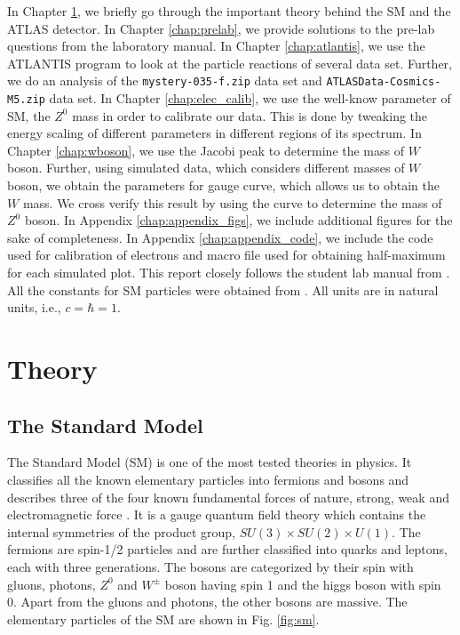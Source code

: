 \documentclass[a4paper]{report}
\numberwithin{equation}{section}
\begin{document}
In Chapter \ref{chap:theory}, we briefly go through the important theory behind the SM and the ATLAS detector. In Chapter \ref{chap:prelab}, we provide solutions to the pre-lab questions from the laboratory manual. In Chapter \ref{chap:atlantis}, we use the ATLANTIS program to look at the particle reactions of several data set. Further, we do an analysis of the \texttt{mystery-035-f.zip} data set and \texttt{ATLASData-Cosmics-M5.zip} data set. In Chapter \ref{chap:elec_calib}, we use the well-know parameter of SM, the $Z^0$ mass in order to calibrate our data. This is done by tweaking the energy scaling of different parameters in different regions of its spectrum. In Chapter \ref{chap:wboson}, we use the Jacobi peak to determine the mass of $W$ boson. Further, using simulated data, which considers different masses of $W$ boson, we obtain the parameters for gauge curve, which allows us to obtain the $W$ mass. We cross verify this result by using the curve to determine the mass of $Z^0$ boson. In Appendix \ref{chap:appendix_figs}, we include additional figures for the sake of completeness. In Appendix \ref{chap:appendix_code}, we include the code used for calibration of electrons and macro file used for obtaining half-maximum for each simulated plot. This report closely follows the student lab manual from \cite{labman}. All the constants for SM particles were obtained from \cite{ParticleDataGroup:2020ssz}. All units are in natural units, i.e., $c = \hbar = 1$. 

\chapter{Theory} \label{chap:theory}

\section{The Standard Model}
The Standard Model (SM) is one of the most tested theories in physics. It classifies all the known elementary particles into fermions and bosons and describes three of the four known fundamental forces of nature, strong, weak and electromagnetic force \cite{ParticleDataGroup:2020ssz}. It is a gauge quantum field theory which contains the internal symmetries of the product group, $SU(3) \times SU(2) \times U(1)$. The fermions are spin-1/2 particles and are further classified into quarks and leptons, each with three generations. The bosons are categorized by their spin with gluons, photons, $Z^0$ and $W^{\pm}$ boson having spin 1 and the higgs boson with spin 0. Apart from the gluons and photons, the other bosons are massive. The elementary particles of the SM are shown in Fig. \ref{fig:sm}.
\end{document}
